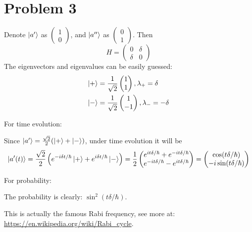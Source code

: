 \documentclass{article}
\begin{document}
\section*{Problem 3}
Denote $\ket{a'}$ as $ \begin{pmatrix}
    1\\0
\end{pmatrix}$, and $\ket{a''}$ as $ \begin{pmatrix}
    0\\1
\end{pmatrix}$. Then
\begin{equation}
    H= \begin{pmatrix}
        0 & \delta \\
        \delta & 0
    \end{pmatrix}
\end{equation}
The eigenvectors and eigenvalues can be easily guessed:
\begin{align}
    \ket{+}&=\frac{1}{\sqrt{2}}\begin{pmatrix}
        1\\1
    \end{pmatrix}, \lambda_+ = \delta
    \\
    \ket{-}&=\frac{1}{\sqrt{2}}\begin{pmatrix}
        1\\-1
    \end{pmatrix}, \lambda_- = -\delta
\end{align}

For time evolution:

Since $\ket{a'}=\frac{\sqrt{2}}{2} (\ket{+}+\ket{-})$, under time
evolution it will be
\begin{equation}
    \ket{a'(t)} = \frac{\sqrt{2}}{2} \left(
        e^{-i\delta t/\hbar}\ket{+}
        + e^{i\delta t/\hbar}\ket{-}
    \right)
    = \frac{1}{2}
    \begin{pmatrix}
        e^{it\delta/\hbar}+e^{-it\delta/\hbar} \\
        e^{-it\delta/\hbar}-e^{it\delta/\hbar} \\
    \end{pmatrix}
    = \begin{pmatrix}
        \cos(t\delta/\hbar) \\ -i\sin(t\delta/\hbar)
    \end{pmatrix}
\end{equation}

For probability:

The probability is clearly: $\sin^2(t\delta/\hbar)$.

\begin{remark}
    This is actually the famous Rabi frequency, see more at:
    \url{https://en.wikipedia.org/wiki/Rabi_cycle}.
\end{remark}
\end{document}
